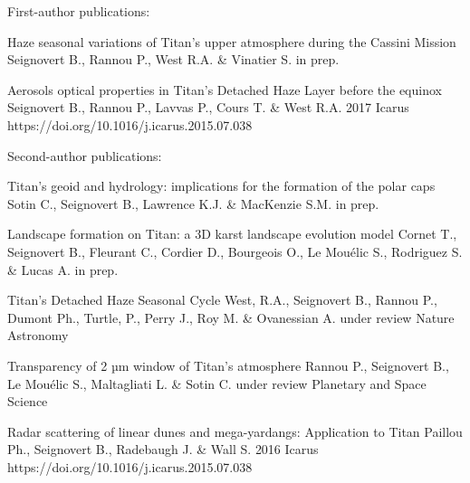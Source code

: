 
\begin{cvpublications}{First-author publications:}

		{Haze seasonal variations of Titan's upper atmosphere during the Cassini Mission}
		{Seignovert B., Rannou P., West R.A. \& Vinatier S.}
		{in prep.}
		{}{}

		{Aerosols optical properties in Titan's Detached Haze Layer before the equinox}
		{Seignovert B., Rannou P., Lavvas P., Cours T. \& West R.A.}
		{2017}
		{Icarus}
		{https://doi.org/10.1016/j.icarus.2015.07.038}

\end{cvpublications}

\begin{cvpublications}{Second-author publications:}

		{Titan’s geoid and hydrology: implications for the formation of the polar caps}
		{Sotin C., Seignovert B., Lawrence K.J. \& MacKenzie S.M.}
		{in prep.}
		{}{}

		{Landscape formation on Titan: a 3D karst landscape evolution model}
		{Cornet T., Seignovert B., Fleurant C., Cordier D., Bourgeois O., Le Mouélic S., Rodriguez S. \& Lucas A.}
		{in prep.}
		{}{}

		{Titan's Detached Haze Seasonal Cycle}
		{West, R.A., Seignovert B., Rannou P., Dumont Ph., Turtle,  P., Perry J., Roy M. \& Ovanessian A.}
		{under review}
		{Nature Astronomy}{}

		{Transparency of 2 µm window of Titan’s atmosphere}
		{Rannou P., Seignovert B., Le Mouélic S., Maltagliati L. \& Sotin C.}
		{under review}
		{Planetary and Space Science}{}

		{Radar scattering of linear dunes and mega-yardangs: Application to Titan}
		{Paillou Ph., Seignovert B., Radebaugh J. \& Wall S.}
		{2016}
		{Icarus}
		{https://doi.org/10.1016/j.icarus.2015.07.038}

\end{cvpublications}
